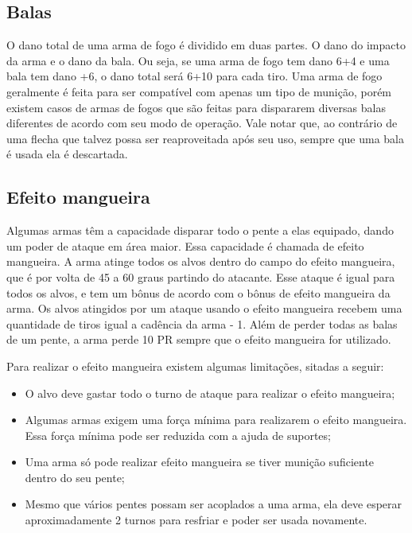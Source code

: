 \subsection{Balas}

O dano total de uma arma de fogo é dividido em duas partes. O dano do impacto da arma e o dano da bala. Ou seja, se uma arma de fogo tem dano 6+4 e uma bala tem dano +6, o dano total será 6+10 para cada tiro. Uma arma de fogo geralmente é feita para ser compatível com apenas um tipo de munição, porém existem casos de armas de fogos que são feitas para dispararem diversas balas diferentes de acordo com seu modo de operação. Vale notar que, ao contrário de uma flecha que talvez possa ser reaproveitada após seu uso, sempre que uma bala é usada ela é descartada.


\subsection{Efeito mangueira}

Algumas armas têm a capacidade disparar todo o pente a elas equipado, dando um poder de ataque em área maior. Essa capacidade é chamada de efeito mangueira. A arma atinge todos os alvos dentro do campo do efeito mangueira, que é por volta de 45 a 60 graus partindo do atacante. Esse ataque é igual para todos os alvos, e tem um bônus de acordo com o bônus de efeito mangueira da arma. Os alvos atingidos por um ataque usando o efeito mangueira recebem uma quantidade de tiros igual a cadência da arma - 1. Além de perder todas as balas de um pente, a arma perde 10 PR sempre que o efeito mangueira for utilizado.

Para realizar o efeito mangueira existem algumas limitações, sitadas a seguir:

\begin{itemize}
	\item O alvo deve gastar todo o turno de ataque para realizar o efeito  mangueira;

	\item Algumas armas exigem uma força mínima para realizarem o efeito mangueira. Essa força mínima pode ser reduzida com a ajuda de suportes;

	\item Uma arma só pode realizar efeito mangueira se tiver munição suficiente dentro do seu pente;

	\item Mesmo que vários pentes possam ser acoplados a uma arma, ela deve esperar aproximadamente 2 turnos para resfriar e poder ser usada novamente.

\end{itemize}


